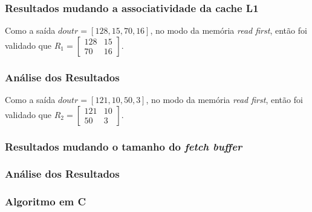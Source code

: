 \documentclass{beamer}
\begin{document}
    \begin{frame}
        \frametitle{Resultados mudando a associatividade da cache L1}

        \begingroup
            Como a saída $ doutr = [128, 15, 70, 16] $, 
            no modo da memória \textit{read first}, então
            foi validado que $ R_1 = \begin{bmatrix} 128 & 15 \\ 70 & 16 \end{bmatrix} $.
        \endgroup

        \begin{figure}[h]
            \centering
          \end{figure}
    \end{frame}

    \begin{frame}
        \frametitle{Análise dos Resultados}

        \begingroup
            Como a saída $ doutr = [121, 10, 50, 3] $, 
            no modo da memória \textit{read first}, então
            foi validado que $ R_2 = \begin{bmatrix} 121 & 10 \\ 50 & 3 \end{bmatrix} $.
        \endgroup

        \begin{figure}[h]
            \centering
          \end{figure}
    \end{frame}

    \begin{frame}[fragile]
        \frametitle{Resultados mudando o tamanho do \textit{fetch buffer}}



    \end{frame}

    \begin{frame}
        \frametitle{Análise dos Resultados}

        

    \end{frame}


    \begin{frame}[fragile]
        \frametitle{Algoritmo em C}

    \end{frame}
\end{document}
